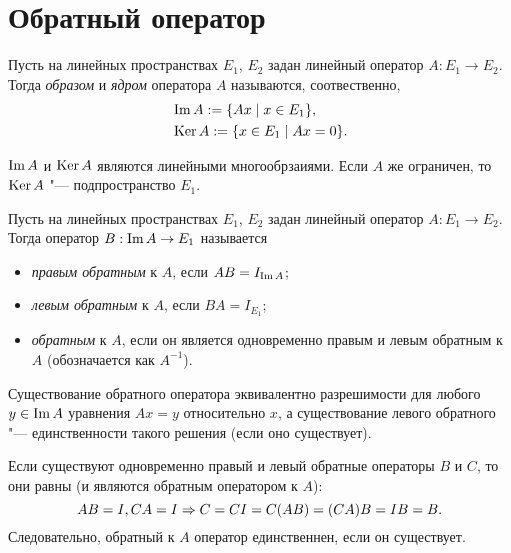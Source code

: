 \documentclass[main]{subfiles}
\begin{document}
\section{Обратный оператор}

\begin{definition}
  Пусть на линейных пространствах \( E_1 \), \( E_2 \)
  задан линейный оператор \( A : E_1 \to E_2 \).
  Тогда \emph{образом} и \emph{ядром} оператора \( A \)
  называются, соотвественно,
  \begin{align}
    &\operatorname{Im} A := \{ A x \mid x \in E_1 \}, \\
    &\operatorname{Ker} A := \{ x \in E_1 \mid A x = 0 \}.
  \end{align}
\end{definition}

\begin{remark}
  \( \operatorname{Im} A \) и \( \operatorname{Ker} A \)
  являются линейными многообрзаиями.
  Если \( A \) же ограничен, то
  \( \operatorname{Ker} A \) "--- подпространство \( E_1 \).
\end{remark}

\begin{definition}
  Пусть на линейных пространствах \( E_1 \), \( E_2 \)
  задан линейный оператор \( A : E_1 \to E_2 \).
  Тогда оператор \( B : \operatorname{Im} A \to E_1 \) называется
  \begin{itemize}
    \item \emph{правым обратным} к \( A \),
      если \( AB = I_{\operatorname{Im} A} \);
    \item \emph{левым обратным} к \( A \),
      если \( BA = I_{E_1} \);
    \item \emph{обратным} к \( A \),
      если он является одновременно правым и левым обратным
      к \( A \) (обозначается как \( A^{-1} \)).
  \end{itemize}
\end{definition}

\begin{remark}
  Существование обратного оператора эквивалентно
  разрешимости для любого \( y \in \operatorname{Im} A \)
  уравнения \( A x = y \) относительно \( x \),
  а существование левого обратного "---
  единственности такого решения (если оно существует).
\end{remark}

\begin{remark}
  Если существуют одновременно
  правый и левый обратные операторы
  \( B \) и \( C \),
  то они равны
  (и являются обратным оператором к \( A \)):
  \[
    AB = I, CA = I \Rightarrow
    C = C I = C (AB) = (CA) B = I B = B.
  \]
  Следовательно, обратный к \( A \) оператор
  единственнен, если он существует.
\end{remark}
\end{document}
